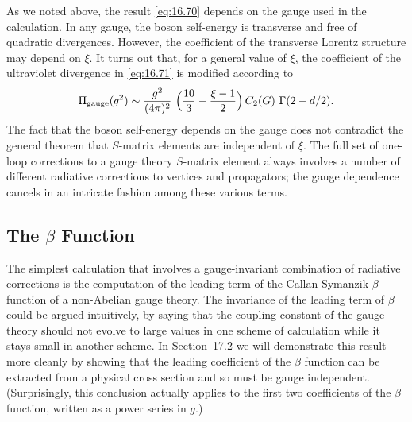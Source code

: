 As we noted above, the result \eqref{eq:16.70} depends on the gauge used in
the calculation.  In any gauge, the boson self-energy is transverse and free
of quadratic divergences.  However, the coefficient of the transverse Lorentz
structure may depend on $\xi$.  It turns out that, for a general value of
$\xi$, the coefficient of the ultraviolet divergence in \eqref{eq:16.71} is
modified according to
\begin{equation}
  \Pi_{\mathrm{gauge}}(q^2) \sim \frac{g^2}{(4\pi)^2}\ \Bigl( \frac{10}{3}
    - \frac{\xi-1}{2} \Bigr)\,C_2(G)\ \Gamma(2-d/2) .
  \label{eq:16.72}
\end{equation}
The fact that the boson self-energy depends on the gauge does not contradict
the general theorem that $S$-matrix elements are independent of $\xi$.  The
full set of one-loop corrections to a gauge theory $S$-matrix element always
involves a number of different radiative corrections to vertices and
propagators; the gauge dependence cancels in an intricate fashion among these
various terms.

\subsection{The $\beta$ Function}

The simplest calculation that involves a gauge-invariant combination of
radiative corrections is the computation of the leading term of the
Callan-Symanzik $\beta$ function of a non-Abelian gauge theory.  The
invariance of the leading term of $\beta$ could be argued intuitively, by
saying that the coupling constant of the gauge theory should not evolve to
large values in one scheme of calculation while it stays small in another
scheme.  In Section~17.2 we will demonstrate this result more cleanly by
showing that the leading coefficient of the $\beta$ function can be extracted
from a physical cross section and so must be gauge independent.  (Surprisingly,
this conclusion actually applies to the first two coefficients of the $\beta$
function, written as a power series in $g$.)

